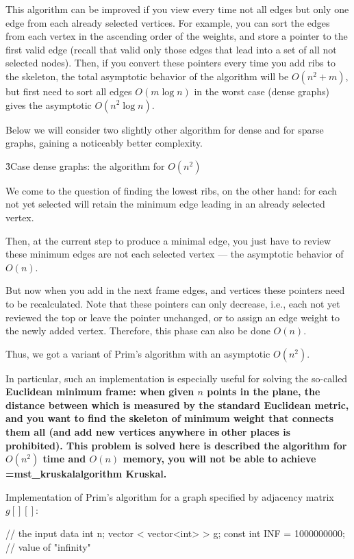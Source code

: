 This algorithm can be improved if you view every time not all edges but only one edge from each already selected vertices. For example, you can sort the edges from each vertex in the ascending order of the weights, and store a pointer to the first valid edge (recall that valid only those edges that lead into a set of all not selected nodes). Then, if you convert these pointers every time you add ribs to the skeleton, the total asymptotic behavior of the algorithm will be $O(n^2 + m)$, but first need to sort all edges $O(m \log n)$ in the worst case (dense graphs) gives the asymptotic $O(n^2 \log n)$.

Below we will consider two slightly other algorithm for dense and for sparse graphs, gaining a noticeably better complexity.


\h3{Case dense graphs: the algorithm for $O(n^2)$}

We come to the question of finding the lowest ribs, on the other hand: for each not yet selected will retain the minimum edge leading in an already selected vertex.

Then, at the current step to produce a minimal edge, you just have to review these minimum edges are not each selected vertex --- the asymptotic behavior of $O(n)$.

But now when you add in the next frame edges, and vertices these pointers need to be recalculated. Note that these pointers can only decrease, i.e., each not yet reviewed the top or leave the pointer unchanged, or to assign an edge weight to the newly added vertex. Therefore, this phase can also be done $O(n)$.

Thus, we got a variant of Prim's algorithm with an asymptotic $O(n^2)$.

In particular, such an implementation is especially useful for solving the so-called \bf{Euclidean minimum frame}: when given $n$ points in the plane, the distance between which is measured by the standard Euclidean metric, and you want to find the skeleton of minimum weight that connects them all (and add new vertices anywhere in other places is prohibited). This problem is solved here is described the algorithm for $O(n^2)$ time and $O(n)$ memory, you will not be able to achieve \algohref=mst_kruskal{algorithm Kruskal}.

Implementation of Prim's algorithm for a graph specified by adjacency matrix $g[][]$:

\code
// the input data
int n;
vector < vector<int> > g;
const int INF = 1000000000; // value of "infinity"


